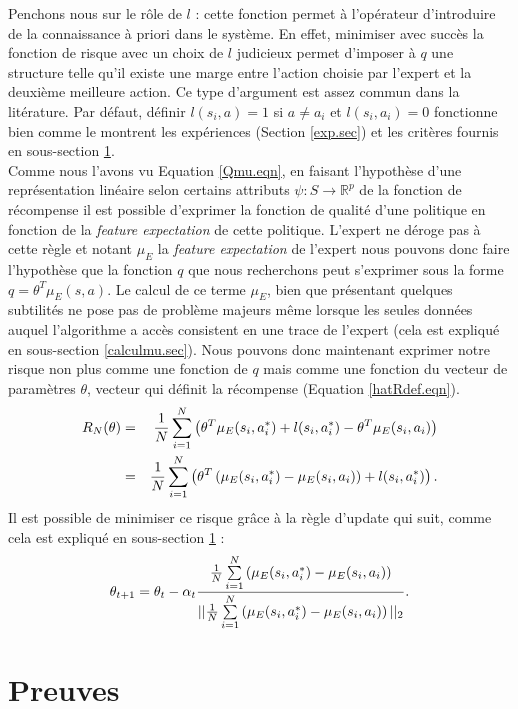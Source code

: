 \documentclass[publibook-draft]{CAp2012}
\begin{document}
Penchons nous sur le rôle de $l$ : cette fonction permet à l'opérateur d'introduire de la connaissance à priori dans le système. En effet, minimiser avec succès la fonction de risque avec un choix de $l$ judicieux permet d'imposer à $q$ une structure telle qu'il existe une marge entre l'action choisie par l'expert et la deuxième meilleure action. Ce type d'argument est assez commun dans la litérature. Par défaut, définir $l(s_i,a) = 1$ si $a\neq a_i$ et $l(s_i,a_i)=0$ fonctionne bien comme le montrent les expériences (Section \ref{exp.sec}) et les critères fournis en sous-section \ref{proof.sec}.\\


Comme nous l'avons vu Equation \ref{Qmu.eqn}, en faisant l'hypothèse d'une représentation linéaire selon certains attributs $\psi : S\rightarrow \mathbb{R}^p$ de la fonction de récompense il est possible d'exprimer la fonction de qualité d'une politique en fonction de la {\it feature expectation} de cette politique. L'expert ne déroge pas à cette règle et notant $\mu_E$ la {\it feature expectation} de l'expert nous pouvons donc faire l'hypothèse que la fonction $q$ que nous recherchons peut s'exprimer sous la forme $q = \theta^T\mu_E(s,a)$. Le calcul de ce terme $\mu_E$, bien que présentant quelques subtilités ne pose pas de problème majeurs même lorsque les seules données auquel l'algorithme a accès consistent en une trace de l'expert (cela est expliqué en sous-section \ref{calculmu.sec}). Nous pouvons donc maintenant exprimer notre risque non plus comme une fonction de $q$ mais comme une fonction du vecteur de paramètres $\theta$, vecteur qui définit la récompense (Equation \ref{hatRdef.eqn}).
   \begin{eqnarray}
   R_N(\theta) &=& {1\over N} \sum_{i=1}^N\left(\theta ^T \mu_E(s_i,a^*_i) + l(s_i,a^*_i) - \theta ^T \mu_E(s_i,a_i) \right)\\
   &=& {1\over N} \sum_{i=1}^N\left(\theta^T\left(\mu_E(s_i,a^*_i) - \mu_E(s_i,a_i)\right) + l(s_i,a^*_i)  \right).
   \end{eqnarray}
   Il est possible de minimiser ce risque grâce à la règle d'update qui suit, comme cela est expliqué en sous-section \ref{proof.sec} :
   \begin{equation}
   \theta_{t+1} = \theta_t -\alpha_t{{1\over N}\sum\limits_{i=1}^N\left(\mu_E(s_i,a^*_i) - \mu_E(s_i,a_i)\right)\over ||{1\over N}\sum\limits_{i=1}^N\left(\mu_E(s_i,a^*_i) - \mu_E(s_i,a_i)\right)||_2}.
   \end{equation}
\section{Preuves}\label{proof.sec}
\end{document}
